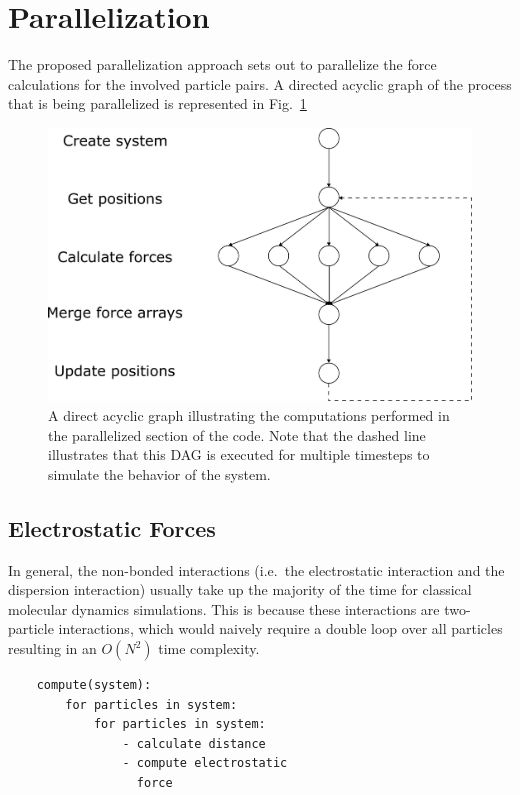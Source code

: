 \documentclass[conference]{IEEEtran}
\begin{document}
\section{Parallelization}\label{par}
The proposed parallelization approach sets out to parallelize the force calculations for the involved particle pairs.
A directed acyclic graph of the process that is being parallelized is represented in Fig.~\ref{fig:dag}
\begin{figure}[H]
    \centering
    \includegraphics[width=\linewidth]{./images/dag.png} %
    \caption{A direct acyclic graph illustrating the computations performed in the parallelized section of the code.
    Note that the dashed line illustrates that this DAG is executed for multiple timesteps to simulate the 
    behavior of the system.}\label{fig:dag}
\end{figure}

\subsection{Electrostatic Forces}
In general, the non-bonded interactions (i.e.\ the electrostatic interaction and the dispersion interaction) usually
take up the majority of the time for classical molecular dynamics simulations. This is because these interactions are
two-particle interactions, which would naively require a double loop over all particles resulting in an $O(N^2)$
time complexity. 
\begin{lstlisting}
    compute(system):
        for particles in system:
            for particles in system:
                - calculate distance
                - compute electrostatic 
                  force
    \end{lstlisting}
\end{document}
